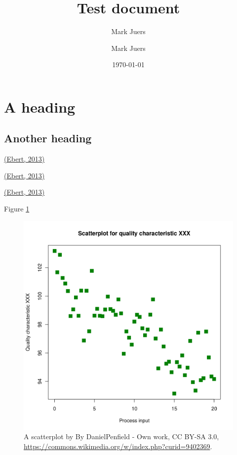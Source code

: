 \documentclass[10pt]{article}
\author[1]{Mark Juers}
\affil[1]{Indiana University}
\begin{document}
\title{Test document}



\author[1]{Mark Juers}%
%


\vspace{-1em}



  \date{\today}


\begingroup
\let\center\flushleft
\let\endcenter\endflushleft
\maketitle
\endgroup









\section*{A heading}

{\label{850151}}

\subsection*{Another heading}

{\label{367935}}

\hyperref[csl:1]{(Ebert, 2013)}

\hyperref[csl:1]{(Ebert, 2013)}

\hyperref[csl:1]{(Ebert, 2013)}

Figure {\ref{286335}}

\par\null{}
\begin{figure}[h!]
\begin{center}
\includegraphics[width=0.70\columnwidth]{figures/scatterplot/scatterplot}
\caption{{A scatterplot by By DanielPenfield - Own work, CC BY-SA 3.0,
\url{https://commons.wikimedia.org/w/index.php?curid=9402369}.
{\label{286335}}%
}}
\end{center}
\end{figure}
\end{document}

